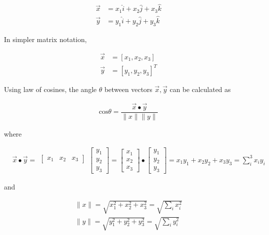 \documentclass[tikz = true, float=false, crop=false, 11pt]{standalone}
\begin{document}
	$$\begin{aligned}
	\vec{x} &= x_1\hat{i} + x_2\hat{j} + x_3\hat{k} \\
	\vec{y} &= y_1\hat{i} + y_2\hat{j} + y_3\hat{k} 
	\end{aligned}$$
	
	In simpler matrix notation, 
	
	$$\begin{aligned}
	\vec{x} &= [x_1, x_2, x_3] \\
	\vec{y} &= [y_1, y_2, y_3]^T
	\end{aligned}$$
	
	Using law of cosines, the angle $\theta$ between vectors $\vec{x},\vec{y}$ can be calculated as
	
	$$\begin{aligned}
	\mathrm{cos}\theta = \dfrac{\vec{x} \bullet \vec{y}}{\lVert x \rVert \lVert y \rVert} 
	\end{aligned}$$
	
	where
	
	$$\begin{aligned}
		& \vec{x} \bullet \vec{y} = 
		\begin{matrix}
		\begin{bmatrix}
		x_1 & x_2 & x_3
		\end{bmatrix}     \\[2.8ex] 
		\end{matrix}
		\begin{bmatrix} 
		y_1 \\ y_2 \\ y_3
		\end{bmatrix} = 
		\begin{bmatrix} 
		x_1 \\ x_2 \\x_3
		\end{bmatrix} \bullet
		\begin{bmatrix} 
		y_1 \\ y_2 \\ y_3
		\end{bmatrix}	= x_1y_1 + x_2y_2 + x_3y_3 = \sum_i^3 x_i y_i
	\end{aligned}$$
	
	and
	
	$$\begin{aligned}
	\lVert x \rVert = \sqrt{x_1^2 + x_2^2 + x_3^2} = \sqrt{\sum_i x_i^2} \\
	\lVert y \rVert = \sqrt{y_1^2 + y_2^2 + y_3^2} = \sqrt{\sum_i y_i^2} \\
	\end{aligned}$$
	
\end{document}
